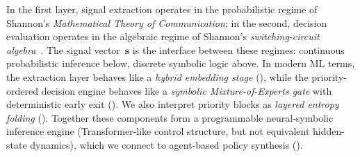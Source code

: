 In the first layer, signal extraction operates in the probabilistic regime of Shannon's \emph{Mathematical Theory of Communication}; in the second, decision evaluation operates in the algebraic regime of Shannon's \emph{switching-circuit algebra}~\cite{shannon1938symbolic}.
The signal vector~$\mathbf{s}$ is the interface between these regimes: continuous probabilistic inference below, discrete symbolic logic above.
In modern ML terms, the extraction layer behaves like a \emph{hybrid embedding stage} (), while the priority-ordered decision engine behaves like a \emph{symbolic Mixture-of-Experts gate} with deterministic early exit ().
We also interpret priority blocks as \emph{layered entropy folding} ().
Together these components form a programmable neural-symbolic inference engine (Transformer-like control structure, but not equivalent hidden-state dynamics), which we connect to agent-based policy synthesis ().

